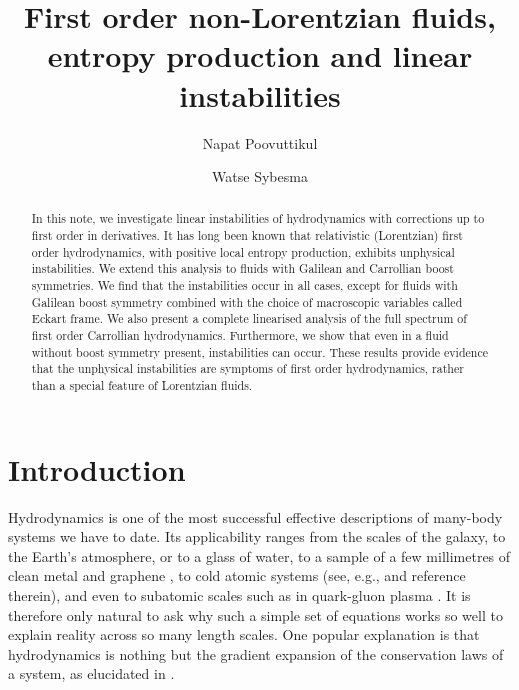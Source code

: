 \documentclass[superscriptaddress,prd,nofootinbib,preprintnumbers,longbibliography,11pt,eqsecnum]{revtex4-1}
\begin{document}
    
\title{First order non-Lorentzian fluids, entropy production and linear instabilities}


\author{Napat Poovuttikul}
\author{Watse Sybesma}

\begin{abstract}
In this note, we investigate linear instabilities of hydrodynamics with corrections up to first order in derivatives. It has long been known that relativistic (Lorentzian) first order hydrodynamics, with positive local entropy production, exhibits unphysical instabilities. We extend this analysis to fluids with Galilean and Carrollian boost symmetries. We find that the instabilities occur in all cases, except for fluids with Galilean boost symmetry combined with the choice of macroscopic variables called Eckart frame. We also present a complete linearised analysis of the full spectrum of first order Carrollian hydrodynamics. Furthermore, we show that even in a fluid without boost symmetry present, instabilities can occur. These results provide evidence that the unphysical instabilities are symptoms of first order hydrodynamics, rather than a special feature of Lorentzian fluids.

\end{abstract}

\maketitle

\newpage
\begingroup
\tableofcontents
\endgroup

 

\section{Introduction}

Hydrodynamics is one of the most successful effective descriptions of many-body systems we have to date. Its applicability ranges from the scales of the galaxy, to the Earth's atmosphere, or to a glass of water, to a sample of a few millimetres of clean metal and graphene \cite{Moll16,Crossno1058,Bandurin1055}, to cold atomic systems (see, e.g., \cite{Adams:2012th} and reference therein), and even to subatomic scales such as in quark-gluon plasma \cite{Teaney:2001av}. It is therefore only natural to ask why such a simple set of equations works so well to explain reality across so many length scales. One popular explanation is that hydrodynamics is nothing but the gradient expansion of the conservation laws of a system, as elucidated in \cite{LLfluid}. 
\end{document}
